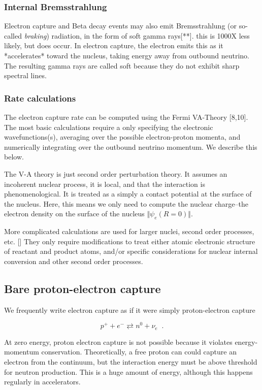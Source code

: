\documentclass[11pt]{amsart}
\begin{document}
\subsubsection{Internal Bremsstrahlung}

Electron capture and Beta decay events may also emit Bremsstrahlung (or so-called \emph{braking}) radiation, in the form of soft gamma rays[**]. this is 1000X less likely, but does occur.  In electron capture, the electron emits this as it *accelerates* toward the nucleus, taking energy away from outbound neutrino.  The resulting gamma rays are called soft because they do not exhibit sharp spectral lines.  

\subsubsection{Rate calculations}

The electron capture rate can be computed using the Fermi VA-Theory [8,10].  The most basic calculations require a only specifying the electronic wavefunctions(s), averaging over the possible electron-proton momenta, and numerically integrating over the outbound neutrino momentum.  We describe this below.

The V-A theory is just second order perturbation theory.  It assumes an incoherent nuclear process, it is local, and that the interaction is phenomenological. It is treated as a simply a contact potential at the surface of the nucleus. Here, this means we only need to compute the nuclear charge--the electron density on the surface of the nucleus $\Vert\psi_{e}(R=0)\Vert$.  

More complicated calculations are used for larger nuclei, second order processes, etc. []  They only require modifications to treat either atomic electronic structure of reactant and product atoms, and/or specific considerations for nuclear internal conversion and other second order processes.

\subsection{Bare proton-electron capture}


We frequently write electron capture as if it were simply proton-electron capture

$$p^{+}+e^{-} \rightleftarrows n^{0}+\nu_{e}\;\;.$$

At zero energy, proton electron capture is not possible because it violates energy-momentum conservation. Theoretically, a free proton can could capture an electron from the continuum, but the interaction energy must be  above threshold for neutron production.  This is a huge amount of energy, although this happens regularly in accelerators.
\end{document}
